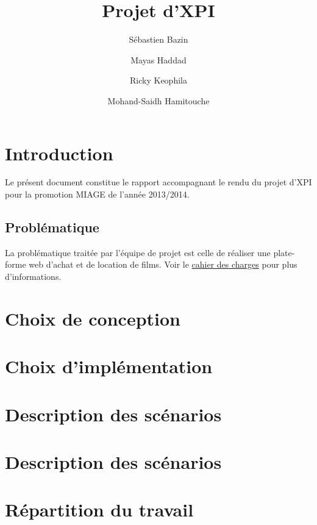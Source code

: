 \documentclass[a4paper,10pt]{report}
\begin{document}
\pagestyle{plain} %


\title{Projet d'XPI}
\author{Sébastien Bazin
\and Mayas Haddad
\and Ricky Keophila
\and Mohand-Saidh Hamitouche}
\maketitle
\tableofcontents

\chapter{Introduction}
Le présent document constitue le rapport accompagnant le rendu du projet d'XPI pour la promotion MIAGE de l'année 2013/2014.

\section{Problématique}
La problématique traitée par l'équipe de projet est celle de réaliser une plate-forme web d'achat et de location de films.
Voir le \href{https://www.lri.fr/~kn/files/projet_xpi_2013.pdf}{cahier des charges} pour plus d'informations.

\chapter{Choix de conception}

\chapter{Choix d'implémentation}

\chapter{Description des scénarios}

\chapter{Description des scénarios}

\chapter{Répartition du travail}

\section{}
\end{document}
